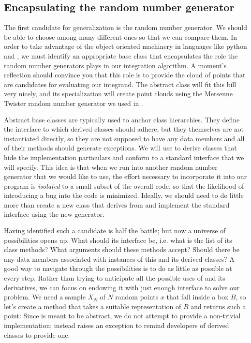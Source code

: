 \subsection{Encapsulating the random number generator}
\label{sec:classes:pointcloud}

The first candidate for generalization is the random number generator. We should be able to
choose among many different ones so that we can compare them. In order to take advantage of the
object oriented machinery in languages like python and \cpp, we must identify an appropriate
base class that encapsulates the role the random number generators plays in our integration
algorithm. A moment's reflection should convince you that this role is to provide the cloud of
points that are candidates for evaluating our integrand. The abstract class 
will fit this bill very nicely, and its specialization  will create point
clouds using the Mersenne Twister random number generator we used in . 

Abstract base classes are typically used to anchor class hierarchies. They define the interface
to which derived classes should adhere, but they themselves are not instantiated directly, so
they are not supposed to have any data members and all of their methods should generate
exceptions. We will use  to derive classes that hide the implementation
particulars and conform to a standard interface that we will specify.  This idea is that when
we run into another random number generator that we would like to use, the effort necessary to
incorporate it into our program is {\em isolated} to a small subset of the overall code, so
that the likelihood of introducing a bug into the code is minimized.  Ideally, we should need
to do little more than create a new class that derives from  and implement
the standard interface using the new generator.

Having identified such a candidate is half the battle; but now a universe of possibilities
opens up. What should its interface be, i.e. what is the list of its class methods? What
arguments should these methods accept? Should there be any data members associated with
instances of this and its derived classes? A good way to navigate through the possibilities is
to do as little as possible at every step. Rather than trying to anticipate all the possible
uses of  and its derivatives, we can focus on endowing it with just enough
interface to solve our problem. We need a sample $X_{N}$ of $N$ random points $x$ that fall inside
a box $B$, so let's create a method  that takes a suitable representation of $B$
and returns such a point:
%
%
Since  is meant to be abstract, we do not attempt to provide a non-trivial
implementation; instead  raises an exception to remind developers of derived
classes to provide one.

